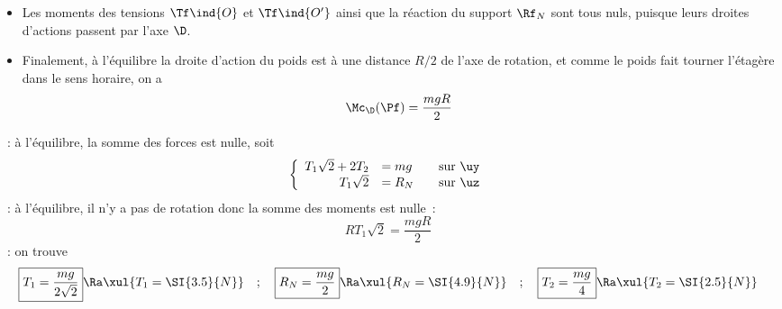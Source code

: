 \documentclass[a4paper, 12pt, final, garamond]{book}
\begin{document}
{\begin{itemize}
\begin{itemize}
\begin{gather*}
			      \end{gather*}
			\item Les moments des tensions $\Tf\ind{O}$ et $\Tf\ind{O'}$ ainsi que la
			      réaction du support $\Rf_N$ sont tous nuls, puisque leurs droites
			      d'actions passent par l'axe $\D$.
			\item Finalement, à l'équilibre la droite d'action du poids est à une
			      distance $R/2$ de l'axe de rotation, et comme le poids fait tourner
			      l'étagère dans le sens horaire, on a
			      \[
				      \Mc_{\D}(\Pf) = \frac{mgR}{2}
			      \]
		\end{itemize}
		~: à l'équilibre, la somme des forces est nulle, soit
		\[
			\left\{
			\begin{array}{rlc}
				T_1 \sqrt{2} + 2T_2 & = mg  & \quad \text{sur}~\uy
				\\
				T_1 \sqrt{2}        & = R_N & \quad \text{sur}~\uz
			\end{array}
			\right.
		\]
		~: à l'équilibre, il n'y a pas de rotation donc la somme des
		moments est nulle~:
		\[
			R T_1\sqrt{2} = \frac{mgR}{2}
		\]
		~: on trouve
		\[
			\boxed{T_1 = \frac{mg}{2 \sqrt{2}}} \Ra \xul{T_1 = \SI{3.5}{N}}
			\quad ; \quad
			\boxed{R_N = \frac{mg}{2}} \Ra \xul{R_N = \SI{4.9}{N}}
			\quad ; \quad
			\boxed{T_2 = \frac{mg}{4}} \Ra \xul{T_2 = \SI{2.5}{N}}
		\]
	\end{itemize}
}
\end{document}
